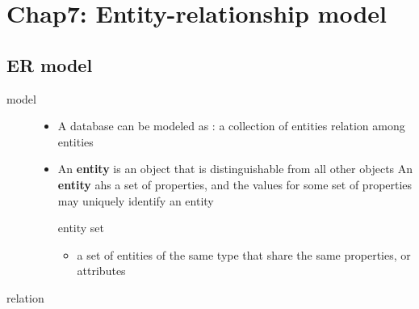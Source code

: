\documentclass[11pt]{article}
\begin{document}
\section{Chap7: Entity-relationship model}
\label{sec-11}
\subsection{ER model}
\label{sec-11-1}
\begin{description}
\item[{model}] \begin{itemize}
\item A database can be modeled as :
a collection of entities
relation among entities
\item An \textbf{entity} is an object that is distinguishable from all other objects
An \textbf{entity} ahs a set of properties, and the values for some set of
properties may uniquely identify an entity
\item[{entity set}] \begin{itemize}
\item a set of entities of the same type that share the same properties,
or attributes
\end{itemize}
\end{itemize}
\item[{relation}] 
\end{description}
\end{document}

